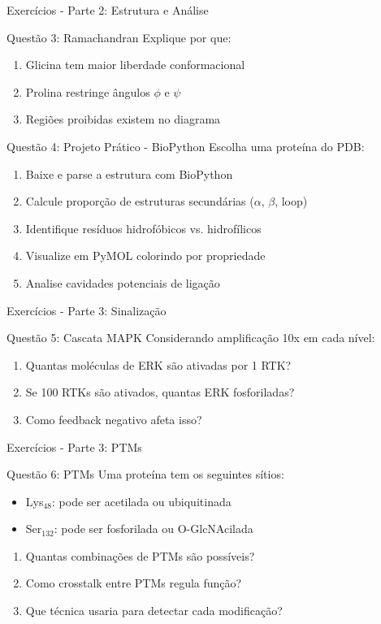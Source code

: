 \begin{frame}[allowframebreaks]{Exercícios - Parte 2: Estrutura e Análise}
\begin{block}{Questão 3: Ramachandran}
Explique por que:
\begin{enumerate}
    \item Glicina tem maior liberdade conformacional
    \item Prolina restringe ângulos $\phi$ e $\psi$
    \item Regiões proibidas existem no diagrama
\end{enumerate}
\end{block}

\begin{alertblock}{Questão 4: Projeto Prático - BioPython}
Escolha uma proteína do PDB:
\begin{enumerate}
    \item Baixe e parse a estrutura com BioPython
    \item Calcule proporção de estruturas secundárias ($\alpha$, $\beta$, loop)
    \item Identifique resíduos hidrofóbicos vs. hidrofílicos
    \item Visualize em PyMOL colorindo por propriedade
    \item Analise cavidades potenciais de ligação
\end{enumerate}
\end{alertblock}
\end{frame}

\begin{frame}{Exercícios - Parte 3: Sinalização}
\begin{block}{Questão 5: Cascata MAPK}
Considerando amplificação 10x em cada nível:
\begin{enumerate}
    \item Quantas moléculas de ERK são ativadas por 1 RTK?
    \item Se 100 RTKs são ativados, quantas ERK fosforiladas?
    \item Como feedback negativo afeta isso?
\end{enumerate}
\end{block}
\end{frame}

\begin{frame}{Exercícios - Parte 3: PTMs}
\begin{block}{Questão 6: PTMs}
Uma proteína tem os seguintes sítios:
\begin{itemize}
    \item Lys$_{48}$: pode ser acetilada ou ubiquitinada
    \item Ser$_{132}$: pode ser fosforilada ou O-GlcNAcilada
\end{itemize}
\begin{enumerate}
    \item Quantas combinações de PTMs são possíveis?
    \item Como crosstalk entre PTMs regula função?
    \item Que técnica usaria para detectar cada modificação?
\end{enumerate}
\end{block}
\end{frame}

